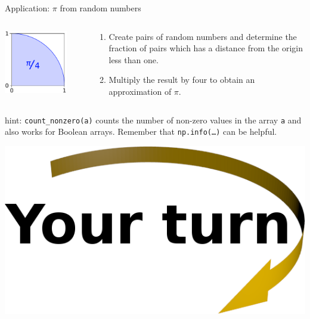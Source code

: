 \documentclass[svgnames]{beamer}
\begin{document}
\begin{frame}{Application: $\pi$ from random numbers}
 \begin{columns}
  \begin{column}{0.4\textwidth}
   \begin{center}
    \includegraphics[width=0.8\textwidth]{random_pi}
   \end{center}
  \end{column}%
  \begin{column}{0.6\textwidth}
   \begin{enumerate}
    \item Create pairs of random numbers and determine the fraction of pairs which
          has a distance from the origin less than one.
    \item Multiply the result by four to obtain an approximation of $\pi$.
   \end{enumerate}
  \end{column}
 \end{columns}

 \vspace{0.5truecm}
 hint: \texttt{count\_nonzero(a)} counts the number of non-zero values in the array \texttt{a} and
 also works for Boolean arrays. Remember that \texttt{np.info(\dots)} can be helpful.

 \vspace{0.3truecm}
 \begin{center}
  \includegraphics[width=3truecm]{yourturn}
 \end{center}
\end{frame}
\end{document}
